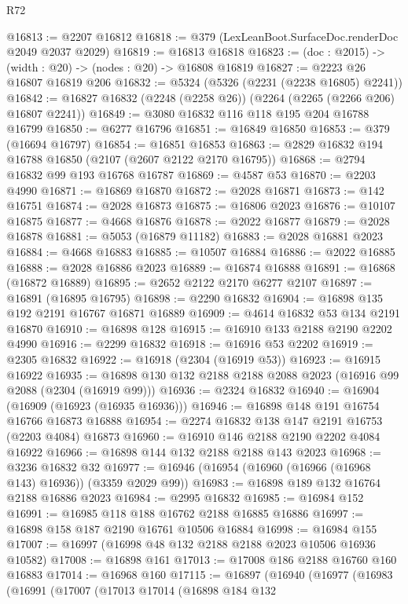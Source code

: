 \begin{lexlean}{R72}
\begin{coremodule}
@16813 := @2207 @16812
@16818 := @379 (LexLeanBoot.SurfaceDoc.renderDoc @2049 @2037 @2029)
@16819 := @16813 @16818
@16823 := (doc : @2015) -> (width : @20) -> (nodes : @20) -> @16808 @16819
@16827 := @2223 @26 @16807 @16819 @206
@16832 := @5324 (@5326 (@2231 (@2238 @16805) @2241))
@16842 := @16827 @16832 (@2248 (@2258 @26)) (@2264 (@2265 (@2266 @206) @16807 @2241))
@16849 := @3080 @16832 @116 @118 @195 @204 @16788 @16799
@16850 := @6277 @16796
@16851 := @16849 @16850
@16853 := @379 (@16694 @16797)
@16854 := @16851 @16853
@16863 := @2829 @16832 @194 @16788 @16850 (@2107 (@2607 @2122 @2170 @16795))
@16868 := @2794 @16832 @99 @193 @16768 @16787
@16869 := @4587 @53
@16870 := @2203 @4990
@16871 := @16869 @16870
@16872 := @2028 @16871
@16873 := @142 @16751
@16874 := @2028 @16873
@16875 := @16806 @2023
@16876 := @10107 @16875
@16877 := @4668 @16876
@16878 := @2022 @16877
@16879 := @2028 @16878
@16881 := @5053 (@16879 @11182)
@16883 := @2028 @16881 @2023
@16884 := @4668 @16883
@16885 := @10507 @16884
@16886 := @2022 @16885
@16888 := @2028 @16886 @2023
@16889 := @16874 @16888
@16891 := @16868 (@16872 @16889)
@16895 := @2652 @2122 @2170 @6277 @2107
@16897 := @16891 (@16895 @16795)
@16898 := @2290 @16832
@16904 := @16898 @135 @192 @2191 @16767 @16871 @16889
@16909 := @4614 @16832 @53 @134 @2191 @16870
@16910 := @16898 @128
@16915 := @16910 @133 @2188 @2190 @2202 @4990
@16916 := @2299 @16832
@16918 := @16916 @53 @2202
@16919 := @2305 @16832
@16922 := @16918 (@2304 (@16919 @53))
@16923 := @16915 @16922
@16935 := @16898 @130 @132 @2188 @2188 @2088 @2023 (@16916 @99 @2088 (@2304 (@16919 @99)))
@16936 := @2324 @16832
@16940 := @16904 (@16909 (@16923 (@16935 @16936)))
@16946 := @16898 @148 @191 @16754 @16766 @16873 @16888
@16954 := @2274 @16832 @138 @147 @2191 @16753 (@2203 @4084) @16873
@16960 := @16910 @146 @2188 @2190 @2202 @4084 @16922
@16966 := @16898 @144 @132 @2188 @2188 @143 @2023
@16968 := @3236 @16832 @32
@16977 := @16946 (@16954 (@16960 (@16966 (@16968 @143) @16936)) (@3359 @2029 @99))
@16983 := @16898 @189 @132 @16764 @2188 @16886 @2023
@16984 := @2995 @16832
@16985 := @16984 @152
@16991 := @16985 @118 @188 @16762 @2188 @16885 @16886
@16997 := @16898 @158 @187 @2190 @16761 @10506 @16884
@16998 := @16984 @155
@17007 := @16997 (@16998 @48 @132 @2188 @2188 @2023 @10506 @16936 @10582)
@17008 := @16898 @161
@17013 := @17008 @186 @2188 @16760 @160 @16883
@17014 := @16968 @160
@17115 := @16897
    (@16940
      (@16977
        (@16983
          (@16991
            (@17007
              (@17013
                @17014
                (@16898
                  @184
                  @132

\end{coremodule}
\end{lexlean}
